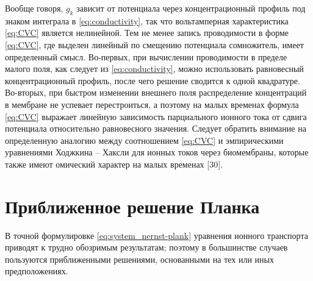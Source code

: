 Вообще говоря, \( g_k \) зависит от потенциала через концентрационный профиль
под знаком интеграла в \eqref{eq:conductivity}, так что вольтамперная
характеристика \eqref{eq:CVC} является нелинейной. Тем не менее запись
проводимости в форме \eqref{eq:CVC}, где выделен линейный по смещению потенциала
сомножитель, имеет определенный смысл. Во-первых, при вычислении проводимости в
пределе малого поля, как следует из \eqref{eq:conductivity}, можно использовать
равновесный концентрационный профиль, после чего решение сводится к одной
квадратуре. Во-вторых, при быстром изменении внешнего поля распределение
концентраций в мембране не успевает перестроиться, а поэтому на малых временах
формула \eqref{eq:CVC} выражает линейную зависимость парциального ионного тока
от сдвига потенциала относительно равновесного значения. Следует обратить
внимание на определенную аналогию между соотношением \eqref{eq:CVC} и
эмпирическими уравнениями Ходжкина -- Хаксли для ионных токов через биомембраны,
которые также имеют омический характер на малых временах [30].

\section{Приближенное решение Планка}
В точной формулировке \eqref{eq:system_nernst-plank} уравнения ионного
транспорта приводят к трудно обозримым результатам; поэтому в большинстве
случаев пользуются приближенными решениями, основанными на тех или иных
предположениях.

